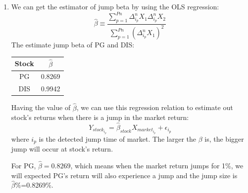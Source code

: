 \documentclass[12pt,letterpaper]{article}
\begin{document}
\begin{enumerate}[label=\textbf{(\Alph*)}]
\item We can get the estimator of jump beta by using the OLS regression:
$$\hat{\beta}\equiv\frac{\sum _{p=1}^{Pn}\Delta_{i_p}^nX_1\Delta_{i_p}^nX_2}{\sum _{p=1}^{Pn}(\Delta_{i_p}^nX_1)^2}$$	
 The estimate jump beta of PG and DIS:
 \begin{table}[ht]
 	\centering %
 	\begin{tabular}{cc} %
 		\hline\hline %
 		Stock&$\hat{\beta}$\\ [0.5ex] %
 		\hline %
 		PG&0.8269\\
 		DIS&0.9942\\ %
 		\hline %
 	\end{tabular}
 \end{table}

Having the value of $\hat{\beta}$, we can use this regression relation to estimate out stock's returns when there is a jump in the market return:
$$Y_{stock_{i_p}}=\hat{\beta}_{stock}X_{market_{i_p}}+\epsilon_{i_p}$$
where ${i_p}$ is the detected jump time of market. The larger the $\beta$ is, the bigger jump will occur at stock's return.

\vspace{3mm}  

For PG, $\hat{\beta}=0.8269$, which means when the market return jumps for 1\%, we will expected PG's return will also experience a  jump and the jump size is   $\hat{\beta}\%$=0.8269\%. 
       
\vspace{3mm}    
          

\end{enumerate}
\end{document}
